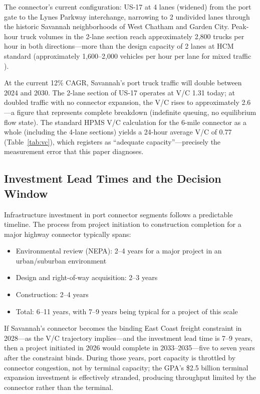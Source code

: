 The connector's current configuration: US-17 at 4 lanes (widened) from the port gate to the Lynes Parkway interchange, narrowing to 2 undivided lanes through the historic Savannah neighborhoods of West Chatham and Garden City. Peak-hour truck volumes in the 2-lane section reach approximately 2,800 trucks per hour in both directions---more than the design capacity of 2 lanes at HCM standard (approximately 1,600--2,000 vehicles per hour per lane for mixed traffic \citep{HCM6}).

At the current 12\% CAGR, Savannah's port truck traffic will double between 2024 and 2030. The 2-lane section of US-17 operates at V/C 1.31 today; at doubled traffic with no connector expansion, the V/C rises to approximately 2.6---a figure that represents complete breakdown (indefinite queuing, no equilibrium flow state). The standard HPMS V/C calculation for the 6-mile connector as a whole (including the 4-lane sections) yields a 24-hour average V/C of 0.77 (Table~\ref{tab:vc}), which registers as ``adequate capacity''---precisely the measurement error that this paper diagnoses.

\subsection{Investment Lead Times and the Decision Window}

Infrastructure investment in port connector segments follows a predictable timeline. The process from project initiation to construction completion for a major highway connector typically spans:

\begin{itemize}
  \item Environmental review (NEPA): 2--4 years for a major project in an urban/suburban environment
  \item Design and right-of-way acquisition: 2--3 years
  \item Construction: 2--4 years
  \item Total: 6--11 years, with 7--9 years being typical for a project of this scale
\end{itemize}

If Savannah's connector becomes the binding East Coast freight constraint in 2028---as the V/C trajectory implies---and the investment lead time is 7--9 years, then a project initiated in 2026 would complete in 2033--2035---five to seven years after the constraint binds. During those years, port capacity is throttled by connector congestion, not by terminal capacity; the GPA's \$2.5 billion terminal expansion investment is effectively stranded, producing throughput limited by the connector rather than the terminal.

